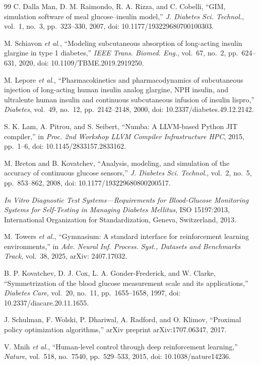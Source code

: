 \documentclass[conference]{IEEEtran}
\begin{document}
\begin{thebibliography}{99}
 C. Dalla Man, D. M. Raimondo, R. A. Rizza, and C. Cobelli, ``GIM,
simulation software of meal glucose--insulin model,'' \emph{J. Diabetes Sci. Technol.},
vol.~1, no.~3, pp.~323--330, 2007, doi: 10.1177/193229680700100303.

 M. Schiavon \emph{et al.}, ``Modeling subcutaneous absorption of
long-acting insulin glargine in type 1 diabetes,'' \emph{IEEE Trans. Biomed. Eng.}, vol.~67,
no.~2, pp.~624--631, 2020, doi: 10.1109/TBME.2019.2919250.

 M. Lepore \emph{et al.}, ``Pharmacokinetics and pharmacodynamics of
subcutaneous injection of long-acting human insulin analog glargine, NPH insulin, and
ultralente human insulin and continuous subcutaneous infusion of insulin lispro,''
\emph{Diabetes}, vol.~49, no.~12, pp.~2142--2148, 2000, doi: 10.2337/diabetes.49.12.2142.

 S. K. Lam, A. Pitrou, and S. Seibert, ``Numba: A LLVM-based Python JIT
compiler,'' in \emph{Proc. 2nd Workshop LLVM Compiler Infrastructure HPC}, 2015, pp.~1--6, doi:
10.1145/2833157.2833162.

 M. Breton and B. Kovatchev, ``Analysis, modeling, and simulation of the
accuracy of continuous glucose sensors,'' \emph{J. Diabetes Sci. Technol.}, vol.~2, no.~5,
pp.~853--862, 2008, doi: 10.1177/193229680800200517.

 \emph{In Vitro Diagnostic Test Systems---Requirements for Blood-Glucose
Monitoring Systems for Self-Testing in Managing Diabetes Mellitus}, ISO 15197:2013,
International Organization for Standardization, Geneva, Switzerland, 2013.

 M. Towers \emph{et al.}, ``Gymnasium: A standard interface for
reinforcement learning environments,'' in \emph{Adv. Neural Inf. Process. Syst., Datasets and
Benchmarks Track}, vol.~38, 2025, arXiv: 2407.17032.

 B. P. Kovatchev, D. J. Cox, L. A. Gonder-Frederick, and W. Clarke,
``Symmetrization of the blood glucose measurement scale and its applications,''
\emph{Diabetes Care}, vol.~20, no.~11, pp.~1655--1658, 1997, doi: 10.2337/diacare.20.11.1655.

 J. Schulman, F. Wolski, P. Dhariwal, A. Radford, and O. Klimov,
``Proximal policy optimization algorithms,'' arXiv preprint arXiv:1707.06347, 2017.

 V. Mnih \emph{et al.}, ``Human-level control through deep reinforcement
learning,'' \emph{Nature}, vol.~518, no.~7540, pp.~529--533, 2015, doi: 10.1038/nature14236.


\end{thebibliography}
\end{document}
